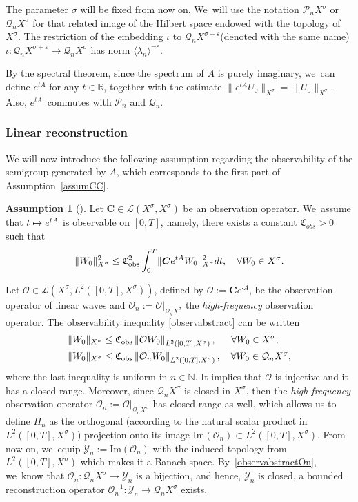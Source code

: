 \documentclass[JEP,XML,SOM,Unicode,published]{cedram}
\newcommand\mto{\mathchoice{\longmapsto}{\mapsto}{\mapsto}{\mapsto}}
\theoremstyle{definition}
\newtheorem{assum}{Assumption}
\newenvironment{assump}[2][]
{\renewcommand\theassum{#2}\begin{assum}[#1]}
{\end{assum}}
\let\mc\mathcal
\let\veps\varepsilon
\renewcommand{\O}{\mc{O}}
\newcommand{\Y}{\mc{Y}}
\newcommand{\R}{\mathbb{R}}
\newcommand{\N}{\mathbb{N}}
\newcommand{\Q}{\mathcal{Q}}
\renewcommand{\P}{\mathcal{P}}
\newcommand{\bC}{\boldsymbol{C}}
\providecommand{\norm}[1]{\lVert#1\rVert}
\providecommand{\inn}[1]{\langle#1\rangle}
\newcommand\nor[2]{\left\|#1\right\|_{#2}}
\begin{document}
The parameter $\sigma$ will be fixed from now on. We~will use the notation $\P_n X^{\sigma}$ or $\Q_n X^{\sigma}$ for that related image of the Hilbert space endowed with the topology of~$X^{\sigma}$. The restriction of the embedding $\iota$ to $\Q_n X^{\sigma+\veps}$(denoted with the same name) $\iota: \Q_n X^{\sigma+\veps}\to \Q_nX^{\sigma}$ has norm $\inn{\lambda_n}^{-\veps}$.

By the spectral theorem, since the spectrum of $A$ is purely imaginary, we~can define $e^{tA}$ for any $t\in \R$, together with the estimate $\norm{e^{tA}U_0}_{X^{\sigma}}=\norm{U_0}_{X^{\sigma}}$. Also, $e^{tA}$~commutes with $\P_n$ and $\Q_n$.

\subsubsection{Linear reconstruction} We will now introduce the following assumption regarding the observability of the semigroup generated by $A$, which corresponds to the first part of Assumption~\ref{assumCC}.
\begin{assump}{2a}
\label{assumC}Let $\bC\in\mc{L}(X^\sigma, X^\sigma)$ be an observation operator. We~assume that $t\mto e^{tA}$ is observable on $[0,T]$, namely, there exists a constant $\mathfrak{C}_{obs}>0$ such that
\begin{align}\label{observabstract}
\norm{W_0}_{X^\sigma}^2\leq \mathfrak{C}_{\textup{obs}}^2\int_0^T \norm{\bC e^{tA}W_0}_{X^\sigma}^2dt,\quad \forall W_0\in X^\sigma.
\end{align}
\end{assump}
Let $\mc{O}\in \mc{L}(X^\sigma, L^2([0, T], X^\sigma))$, defined by $\mc{O}:=\bC e^{\cdot A}$, be the observation operator of linear waves and $\mc{O}_n:=\mc{O}|_{\Q_nX^\sigma}$ the \emph{high-frequency} observation operator. The observability inequality \eqref{observabstract} can be written
\begin{align}\label{observabstractO}
\norm{W_0}_{X^\sigma}&\leq \mathfrak{C}_{\textup{obs}}\nor{\O W_{0}}{L^{2}([0,T],X^\sigma)},\quad\;\; \forall W_0\in X^\sigma,\\
\label{observabstractOn} \norm{W_0}_{X^\sigma}&\leq \mathfrak{C}_{\textup{obs}}\nor{\O_{n} W_{0}}{L^{2}([0,T],X^\sigma)},\quad \forall W_0\in \Q_n X^\sigma,
\end{align}
where the last inequality is uniform in $n\in \N$.
It implies that $\mc{O}$ is injective and it has a closed range. Moreover, since $\Q_nX^\sigma$ is closed in $X^\sigma$, then the \emph{high-frequency} observation operator $\mc{O}_n:=\mc{O}|_{\Q_nX^\sigma}$ has closed range as well, which allows us to define $\Pi_n$ as the orthogonal (according to the natural scalar product in $L^2([0, T], X^\sigma)$) projection onto its image $\text{Im}(\mc{O}_n)\subset L^2([0, T], X^\sigma)$. From now on, we~equip $\Y_n:=\text{Im}(\O_n)$ with the induced topology from $L^2([0, T], X^\sigma)$ which makes it a Banach space. By~\eqref{observabstractOn}, we~know that $\O_n: \Q_n X^\sigma\to \Y_n$ is a bijection, and hence, $\Y_n$ is closed, a bounded reconstruction operator $\O_n^{-1}: \Y_n\to \Q_n X^\sigma$ exists.
\end{document}
